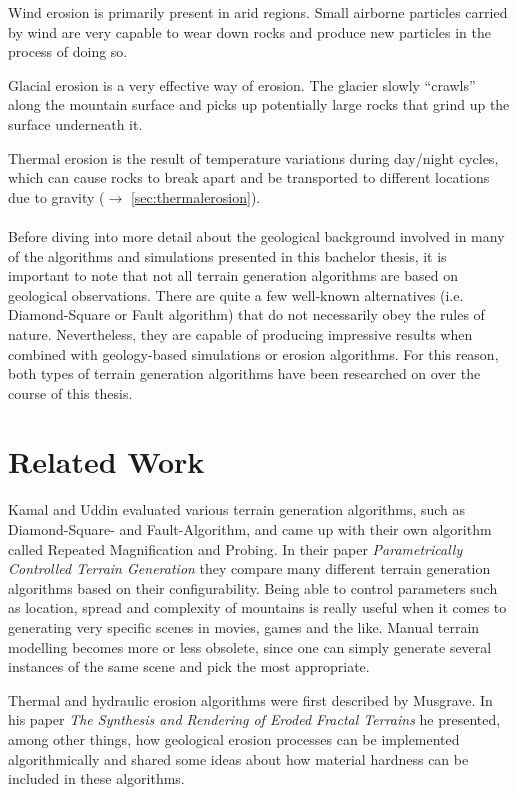 \documentclass[11pt,a4paper,twoside,openright]{report}
\begin{document}
Wind erosion is primarily present in arid regions. Small airborne particles carried by wind are very capable to wear down rocks and produce new particles in the process of doing so.

Glacial erosion is a very effective way of erosion. The glacier slowly ``crawls'' along the mountain surface and picks up potentially large rocks that grind up the surface underneath it.

Thermal erosion is the result of temperature variations during day/night cycles, which can cause rocks to break apart and be transported to different locations due to gravity ($\rightarrow$ \cref{sec:thermalerosion}).
\\ \\
Before diving into more detail about the geological background involved in many of the algorithms and simulations presented in this bachelor thesis, it is important to note that not all terrain generation algorithms are based on geological observations. There are quite a few well-known alternatives (i.e. Diamond-Square or Fault algorithm) that do not necessarily obey the rules of nature. Nevertheless, they are capable of producing impressive results when combined with geology-based simulations or erosion algorithms. For this reason, both types of terrain generation algorithms have been researched on over the course of this thesis.

\chapter{Related Work}
\label{sec:related}
Kamal and Uddin evaluated various terrain generation algorithms, such as Diamond-Square- and Fault-Algorithm, and came up with their own algorithm called Repeated Magnification and Probing. In their paper \emph{Parametrically Controlled Terrain Generation} \cite{Kamal:2007:PCT:1321261.1321264} they compare many different terrain generation algorithms based on their configurability. Being able to control parameters such as location, spread and complexity of mountains is really useful when it comes to generating very specific scenes in movies, games and the like. Manual terrain modelling becomes more or less obsolete, since one can simply generate several instances of the same scene and pick the most appropriate.

Thermal and hydraulic erosion algorithms were first described by Musgrave. In his paper  \emph{The Synthesis and Rendering of Eroded Fractal Terrains} \cite{Musgrave:1989:SRE:74333.74337} he presented, among other things, how geological erosion processes can be implemented algorithmically and shared some ideas about how material hardness can be included in these algorithms.
\end{document}
